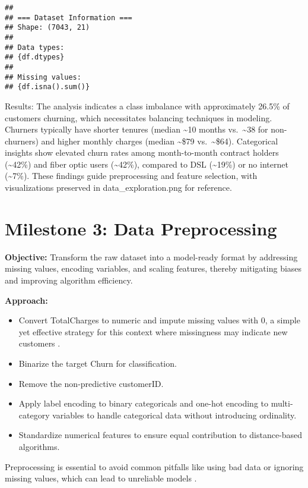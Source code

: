 \documentclass[preprint, 3p,
authoryear]{elsarticle} %
\providecommand{\tightlist}{%
  \setlength{\itemsep}{0pt}\setlength{\parskip}{0pt}}
\begin{document}
\begin{verbatim}
## 
## === Dataset Information ===
## Shape: (7043, 21)
## 
## Data types:
## {df.dtypes}
## 
## Missing values:
## {df.isna().sum()}
\end{verbatim}

Results: The analysis indicates a class imbalance with approximately
26.5\% of customers churning, which necessitates balancing techniques in
modeling. Churners typically have shorter tenures (median
\textasciitilde10 months vs.~\textasciitilde38 for non-churners) and
higher monthly charges (median \textasciitilde\$79
vs.~\textasciitilde\$64). Categorical insights show elevated churn rates
among month-to-month contract holders (\textasciitilde42\%) and fiber
optic users (\textasciitilde42\%), compared to DSL (\textasciitilde19\%)
or no internet (\textasciitilde7\%). These findings guide preprocessing
and feature selection, with visualizations preserved in
data\_exploration.png for reference.

\section{Milestone 3: Data
Preprocessing}\label{milestone-3-data-preprocessing}

\textbf{Objective:} Transform the raw dataset into a model-ready format
by addressing missing values, encoding variables, and scaling features,
thereby mitigating biases and improving algorithm efficiency.

\textbf{Approach:}

\begin{itemize}
\tightlist
\item
  Convert TotalCharges to numeric and impute missing values with 0, a
  simple yet effective strategy for this context where missingness may
  indicate new customers \citep{karrar2022effect, ragel1999mvc}.
\item
  Binarize the target Churn for classification.
\item
  Remove the non-predictive customerID.
\item
  Apply label encoding to binary categoricals and one-hot encoding to
  multi-category variables to handle categorical data without
  introducing ordinality.
\item
  Standardize numerical features to ensure equal contribution to
  distance-based algorithms.
\end{itemize}

Preprocessing is essential to avoid common pitfalls like using bad data
or ignoring missing values, which can lead to unreliable models
\citep{kim20209}.
\end{document}
